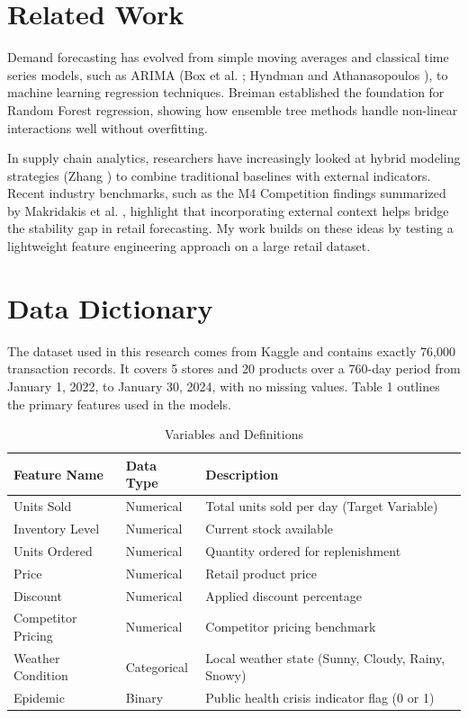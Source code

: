 \documentclass[12pt]{article}
\begin{document}
\section{Related Work}
Demand forecasting has evolved from simple moving averages and classical time series models, such as ARIMA (Box et al. \cite{box2015}; Hyndman and Athanasopoulos \cite{hyndman2018}), to machine learning regression techniques. Breiman \cite{breiman2001} established the foundation for Random Forest regression, showing how ensemble tree methods handle non-linear interactions well without overfitting. 

In supply chain analytics, researchers have increasingly looked at hybrid modeling strategies (Zhang \cite{zhang2003}) to combine traditional baselines with external indicators. Recent industry benchmarks, such as the M4 Competition findings summarized by Makridakis et al. \cite{makridakis2020}, highlight that incorporating external context helps bridge the stability gap in retail forecasting. My work builds on these ideas by testing a lightweight feature engineering approach on a large retail dataset.

\section{Data Dictionary}
The dataset used in this research comes from Kaggle and contains exactly 76,000 transaction records. It covers 5 stores and 20 products over a 760-day period from January 1, 2022, to January 30, 2024, with no missing values. Table 1 outlines the primary features used in the models.

\begin{table}[h]
\centering
\caption{Variables and Definitions}
\begin{tabular}{lll}
\toprule
Feature Name & Data Type & Description \\
\midrule
Units Sold & Numerical & Total units sold per day (Target Variable) \\
Inventory Level & Numerical & Current stock available \\
Units Ordered & Numerical & Quantity ordered for replenishment \\
Price & Numerical & Retail product price \\
Discount & Numerical & Applied discount percentage \\
Competitor Pricing & Numerical & Competitor pricing benchmark \\
Weather Condition & Categorical & Local weather state (Sunny, Cloudy, Rainy, Snowy) \\
Epidemic & Binary & Public health crisis indicator flag (0 or 1) \\
\bottomrule
\end{tabular}
\end{table}
\end{document}
